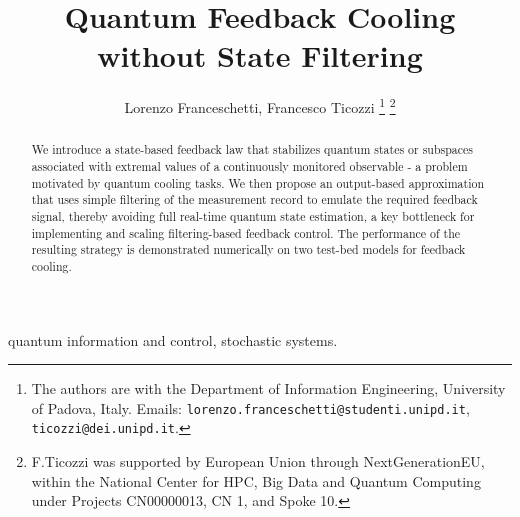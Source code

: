 \documentclass[conference]{IEEEtran}
\theoremstyle{plain}
\theoremstyle{plain}
\theoremstyle{plain}
\theoremstyle{plain}
\theoremstyle{remark}
\theoremstyle{definition}
\begin{document}
\title{Quantum Feedback Cooling without State Filtering}

\author{Lorenzo Franceschetti, Francesco Ticozzi
\thanks{The authors are with the Department of Information Engineering, University of Padova, Italy. Emails: \texttt{lorenzo.franceschetti@studenti.unipd.it}, \texttt{ticozzi@dei.unipd.it}.}%
\thanks{F.Ticozzi was supported by European Union through
NextGenerationEU, within the National Center for HPC, Big Data and
Quantum Computing under Projects CN00000013, CN 1, and Spoke
10.}}

\maketitle

\begin{abstract}
We introduce a state-based feedback law that stabilizes quantum states or subspaces associated with extremal values of a continuously monitored observable - a problem motivated by quantum cooling tasks. We then propose an output-based approximation that uses simple filtering of the measurement record to emulate the required feedback signal, thereby avoiding full real-time quantum state estimation, a key bottleneck for implementing and scaling filtering-based feedback control. The performance of the  resulting strategy is demonstrated numerically on two test-bed models for feedback cooling.
\end{abstract}

\begin{IEEEkeywords}
quantum information and control, stochastic systems.
\end{IEEEkeywords}

\thispagestyle{empty}
\pagestyle{empty}
\end{document}
